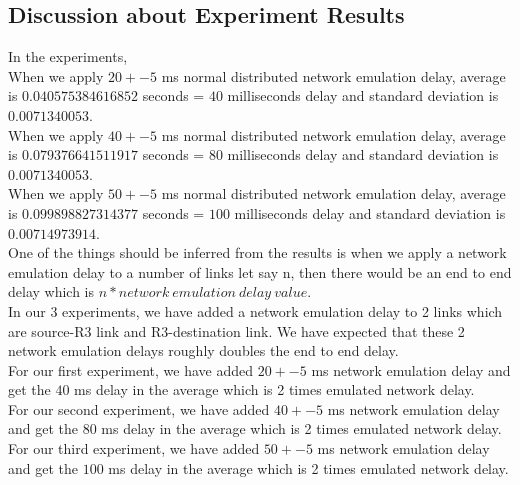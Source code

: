 \documentclass[conference]{IEEEtran}
\begin{document}
\subsection{Discussion about Experiment Results}
In the experiments,\\
When we apply $20 +-5$ ms normal distributed network emulation delay, average is $0.040575384616852$ seconds = $40$ milliseconds delay and standard deviation is $0.0071340053$.\\

When we apply $40 +-5$ ms normal distributed network emulation delay, average is $0.079376641511917$ seconds  = $80$ milliseconds delay and standard deviation is $0.0071340053$.\\

When we apply $50 +-5$ ms normal distributed network emulation delay, average is $0.099898827314377$ seconds = $100$ milliseconds delay and standard deviation is $0.00714973914$.\\

One of the things should be inferred from the results is when we apply a network emulation delay to a number of links let say n, then there would be an end to end delay which is $n*network\ emulation\ delay\ value$.\\

In our 3 experiments,  we have added a network emulation delay to 2 links which are source-R3 link and R3-destination link. We have expected that these 2 network emulation delays roughly doubles the end to end delay.\\ 
For our first experiment, we have added $20+-5$ ms network emulation delay and get the $40$ ms delay in the average which is 2 times emulated network delay.\\
For our second experiment, we have added $40+-5$ ms network emulation delay and get the $80$ ms delay in the average which is 2 times emulated network delay.\\
For our third experiment, we have added $50+-5$ ms network emulation delay and get the $100$ ms delay in the average which is 2 times emulated network delay.\\
\end{document}
